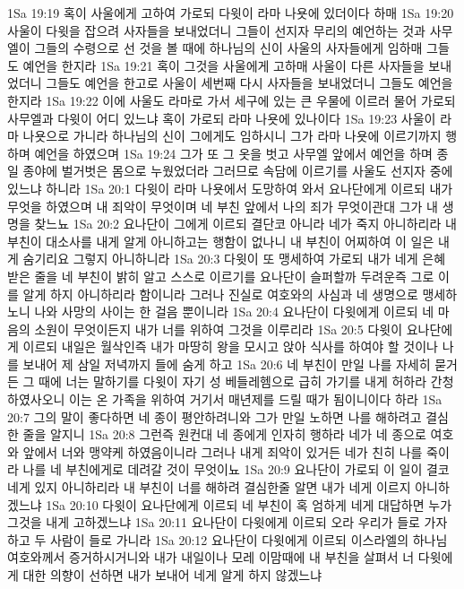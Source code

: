 1Sa 19:19  혹이 사울에게 고하여 가로되 다윗이 라마 나욧에 있더이다 하매
1Sa 19:20  사울이 다윗을 잡으려 사자들을 보내었더니 그들이 선지자 무리의 예언하는 것과 사무엘이 그들의 수령으로 선 것을 볼 때에 하나님의 신이 사울의 사자들에게 임하매 그들도 예언을 한지라
1Sa 19:21  혹이 그것을 사울에게 고하매 사울이 다른 사자들을 보내었더니 그들도 예언을 한고로 사울이 세번째 다시 사자들을 보내었더니 그들도 예언을 한지라
1Sa 19:22  이에 사울도 라마로 가서 세구에 있는 큰 우물에 이르러 물어 가로되 사무엘과 다윗이 어디 있느냐 혹이 가로되 라마 나욧에 있나이다
1Sa 19:23  사울이 라마 나욧으로 가니라 하나님의 신이 그에게도 임하시니 그가 라마 나욧에 이르기까지 행하며 예언을 하였으며
1Sa 19:24  그가 또 그 옷을 벗고 사무엘 앞에서 예언을 하며 종일 종야에 벌거벗은 몸으로 누웠었더라 그러므로 속담에 이르기를 사울도 선지자 중에 있느냐 하니라
1Sa 20:1  다윗이 라마 나욧에서 도망하여 와서 요나단에게 이르되 내가 무엇을 하였으며 내 죄악이 무엇이며 네 부친 앞에서 나의 죄가 무엇이관대 그가 내 생명을 찾느뇨
1Sa 20:2  요나단이 그에게 이르되 결단코 아니라 네가 죽지 아니하리라 내 부친이 대소사를 내게 알게 아니하고는 행함이 없나니 내 부친이 어찌하여 이 일은 내게 숨기리요 그렇지 아니하니라
1Sa 20:3  다윗이 또 맹세하여 가로되 내가 네게 은혜 받은 줄을 네 부친이 밝히 알고 스스로 이르기를 요나단이 슬퍼할까 두려운즉 그로 이를 알게 하지 아니하리라 함이니라 그러나 진실로 여호와의 사심과 네 생명으로 맹세하노니 나와 사망의 사이는 한 걸음 뿐이니라
1Sa 20:4  요나단이 다윗에게 이르되 네 마음의 소원이 무엇이든지 내가 너를 위하여 그것을 이루리라
1Sa 20:5  다윗이 요나단에게 이르되 내일은 월삭인즉 내가 마땅히 왕을 모시고 앉아 식사를 하여야 할 것이나 나를 보내어 제 삼일 저녁까지 들에 숨게 하고
1Sa 20:6  네 부친이 만일 나를 자세히 묻거든 그 때에 너는 말하기를 다윗이 자기 성 베들레헴으로 급히 가기를 내게 허하라 간청하였사오니 이는 온 가족을 위하여 거기서 매년제를 드릴 때가 됨이니이다 하라
1Sa 20:7  그의 말이 좋다하면 네 종이 평안하려니와 그가 만일 노하면 나를 해하려고 결심한 줄을 알지니
1Sa 20:8  그런즉 원컨대 네 종에게 인자히 행하라 네가 네 종으로 여호와 앞에서 너와 맹약케 하였음이니라 그러나 내게 죄악이 있거든 네가 친히 나를 죽이라 나를 네 부친에게로 데려갈 것이 무엇이뇨
1Sa 20:9  요나단이 가로되 이 일이 결코 네게 있지 아니하리라 내 부친이 너를 해하려 결심한줄 알면 내가 네게 이르지 아니하겠느냐
1Sa 20:10  다윗이 요나단에게 이르되 네 부친이 혹 엄하게 네게 대답하면 누가 그것을 내게 고하겠느냐
1Sa 20:11  요나단이 다윗에게 이르되 오라 우리가 들로 가자 하고 두 사람이 들로 가니라
1Sa 20:12  요나단이 다윗에게 이르되 이스라엘의 하나님 여호와께서 증거하시거니와 내가 내일이나 모레 이맘때에 내 부친을 살펴서 너 다윗에게 대한 의향이 선하면 내가 보내어 네게 알게 하지 않겠느냐
